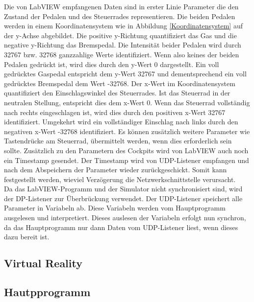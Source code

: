 Die von LabVIEW empfangenen Daten sind in erster Linie Parameter die den Zustand der Pedalen und des Steuerrades representieren. Die beiden Pedalen werden in einem Koordinatensystem wie in Abbildung \ref{Koordinatensystem} auf der y-Achse abgebildet. Die positive y-Richtung quantifiziert das Gas und die negative y-Richtung das Bremspedal. Die Intensität beider Pedalen wird durch 32767 bzw. 32768 ganzzahlige Werte identifiziert. Wenn also keines der beiden Pedalen gedrückt ist, wird dies durch den y-Wert 0 dargestellt. Ein voll gedrücktes Gaspedal entspricht dem y-Wert 32767 und dementsprechend ein voll gedrücktes Bremspedal dem Wert -32768. Der x-Wert im Koordinatensystem quantifiziert den Einschlagswinkel des Steuerrades. Ist das Steuerrad in der neutralen Stellung, entspricht dies dem x-Wert 0. Wenn das Steuerrad vollständig nach rechts eingeschlagen ist, wird dies durch den positiven x-Wert 32767 identifiziert. Umgekehrt wird ein vollständiger Einschlag nach links durch den negativen x-Wert -32768 identifiziert. Es können zusätzlich weitere Parameter wie Tastendrücke am Steuerrad, übermittelt werden, wenn dies erforderlich sein sollte. Zusätzlich zu den Parametern des Cockpits wird von LabVIEW auch noch ein Timestamp gesendet. Der Timestamp wird von UDP-Listener empfangen und nach dem Abspeichern der Parameter wieder zurückgeschickt. Somit kann festgestellt werden, wieviel Verzögerung die Netzwerkschnittstelle verursacht. \\
Da das LabVIEW-Programm und der Simulator nicht synchronisiert sind, wird der DP-Listener zur Überbrückung verwendet. Der UDP-Listener speichert alle Parameter in Variabeln ab. Diese Variabeln werden vom Hauptprogramm ausgelesen und interpretiert. Dieses auslesen der Variabeln erfolgt nun synchron, da das Hauptprogramm nur dann Daten vom UDP-Listener liest, wenn dieses dazu bereit ist.

\subsection{Virtual Reality}
\subsection{Hautpprogramm}





